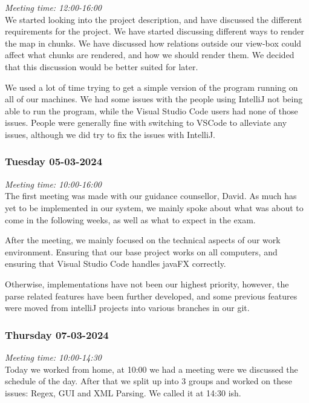 \emph{Meeting time: 12:00-16:00}\\
We started looking into the project description, and have discussed the
different requirements for the project. We have started discussing
different ways to render the map in chunks. We have discussed how
relations outside our view-box could affect what chunks are rendered,
and how we should render them. We decided that this discussion would be
better suited for later.

We used a lot of time trying to get a simple version of the program
running on all of our machines. We had some issues with the people using
IntelliJ not being able to run the program, while the Visual Studio Code
users had none of those issues. People were generally fine with
switching to VSCode to alleviate any issues, although we did try to fix
the issues with IntelliJ.

\hypertarget{tuesday-05-03-2024}{%
\subsubsection*{Tuesday 05-03-2024}\label{tuesday-05-03-2024}}

\emph{Meeting time: 10:00-16:00}\\
The first meeting was made with our guidance counsellor, David. As much
has yet to be implemented in our system, we mainly spoke about what was
about to come in the following weeks, as well as what to expect in the
exam.

After the meeting, we mainly focused on the technical aspects of our
work environment. Ensuring that our base project works on all computers,
and ensuring that Visual Studio Code handles javaFX correctly.

Otherwise, implementations have not been our highest priority, however,
the parse related features have been further developed, and some
previous features were moved from intelliJ projects into various
branches in our git.

\hypertarget{thursday-07-03-2024}{%
\subsubsection*{Thursday 07-03-2024}\label{thursday-07-03-2024}}

\emph{Meeting time: 10:00-14:30}\\
Today we worked from home, at 10:00 we had a meeting were we discussed
the schedule of the day. After that we split up into 3 groups and worked
on these issues: Regex, GUI and XML Parsing. We called it at 14:30 ish.

